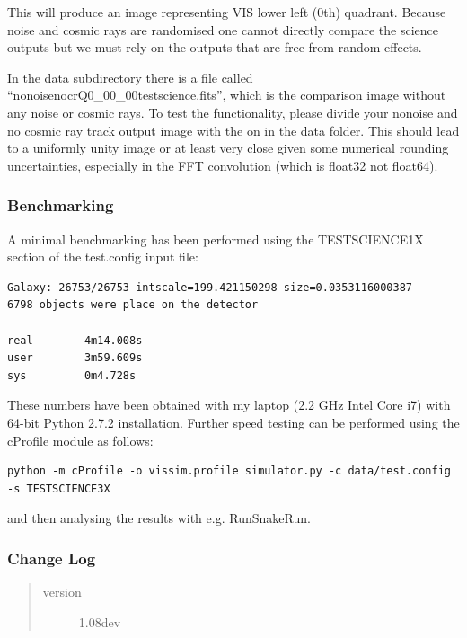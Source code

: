 \documentclass[a4paper,12pt,english]{sphinxmanual}
\begin{document}
This will produce an image representing VIS lower left (0th) quadrant. Because
noise and cosmic rays are randomised one cannot directly compare the science
outputs but we must rely on the outputs that are free from random effects.

In the data subdirectory there is a file called ``nonoisenocrQ0\_00\_00testscience.fits'',
which is the comparison image without any noise or cosmic rays. To test the functionality,
please divide your nonoise and no cosmic ray track output image with the on in the data
folder. This should lead to a uniformly unity image or at least very close given some
numerical rounding uncertainties, especially in the FFT convolution (which is float32 not
float64).


\subsubsection{Benchmarking}
\label{simulator:benchmarking}
A minimal benchmarking has been performed using the TESTSCIENCE1X section of the test.config input file:

\begin{Verbatim}[commandchars=\\\{\}]
Galaxy: 26753/26753 intscale=199.421150298 size=0.0353116000387
6798 objects were place on the detector

real        4m14.008s
user        3m59.609s
sys         0m4.728s
\end{Verbatim}

These numbers have been obtained with my laptop (2.2 GHz Intel Core i7) with
64-bit Python 2.7.2 installation. Further speed testing can be performed using the cProfile module
as follows:

\begin{Verbatim}[commandchars=\\\{\}]
python -m cProfile -o vissim.profile simulator.py -c data/test.config -s TESTSCIENCE3X
\end{Verbatim}

and then analysing the results with e.g. RunSnakeRun.


\subsubsection{Change Log}
\label{simulator:change-log}\begin{quote}\begin{description}
\item[{version}] \leavevmode
1.08dev

\end{description}\end{quote}
\end{document}
